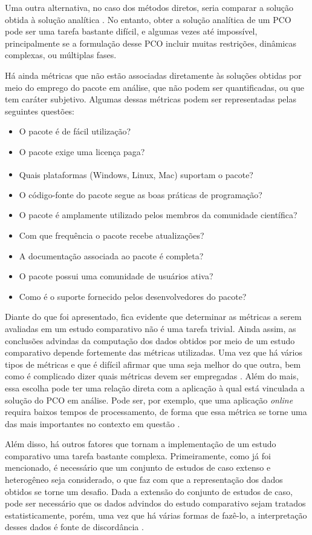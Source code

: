 Uma outra alternativa, no caso dos métodos diretos, seria comparar a solução obtida à solução analítica \cite{darby_hp-adaptive_2011}. No entanto, obter a solução analítica de um PCO pode ser uma tarefa bastante difícil, e algumas vezes até impossível, principalmente se a formulação desse PCO incluir muitas restrições, dinâmicas complexas, ou múltiplas fases. 

Há ainda métricas que não estão associadas diretamente às soluções obtidas por meio do emprego do pacote em análise, que não podem ser quantificadas, ou que tem caráter subjetivo. Algumas dessas métricas podem ser representadas pelas seguintes questões: 
\begin{itemize}
	\item O pacote é de fácil utilização?
	\item O pacote exige uma licença paga? 
	\item Quais plataformas (Windows\textsuperscript{\textregistered}, Linux, Mac\textsuperscript{\textregistered}) suportam o pacote? 
	\item O código-fonte do pacote segue as boas práticas de programação? 
	\item O pacote é amplamente utilizado pelos membros da comunidade científica? 
	\item Com que frequência o pacote recebe atualizações? 
	\item A documentação associada ao pacote é completa? 
	\item O pacote possui uma comunidade de usuários ativa? 
	\item Como é o suporte fornecido pelos desenvolvedores do pacote?
\end{itemize} 

Diante do que foi apresentado, fica evidente que determinar as métricas a serem avaliadas em um estudo comparativo não é uma tarefa trivial. Ainda assim, as conclusões advindas da computação dos dados obtidos por meio de um estudo comparativo depende fortemente das métricas utilizadas. Uma vez que há vários tipos de métricas e que é difícil afirmar que uma seja melhor do que outra, bem como é complicado dizer quais métricas devem ser empregadas \cite{bongartz_numerical_1997}. Além do mais, essa escolha pode ter uma relação direta com a aplicação à qual está vinculada a solução do PCO em análise. Pode ser, por exemplo, que uma aplicação \textit{online} requira baixos tempos de processamento, de forma que essa métrica se torne uma das mais importantes no contexto em questão \cite{febbo_nloptcontrol_2020}. 

Além disso, há outros fatores que tornam a implementação de um estudo comparativo uma tarefa bastante complexa. Primeiramente, como já foi mencionado, é necessário que um conjunto de estudos de caso extenso e heterogêneo seja considerado, o que faz com que a representação dos dados obtidos se torne um desafio. Dada a extensão do conjunto de estudos de caso, pode ser necessário que os dados advindos do estudo comparativo sejam tratados estatisticamente, porém, uma vez que há várias formas de fazê-lo, a interpretação desses dados é fonte de discordância \cite{dolan_benchmarking_2002, bongartz_numerical_1997}. 

